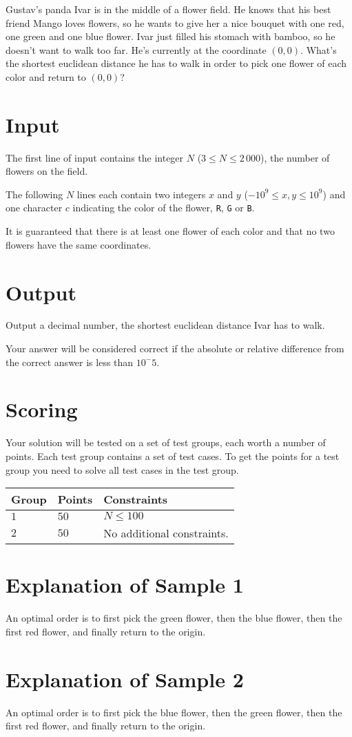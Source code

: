 \noindent

Gustav's panda Ivar is in the middle of a flower field.
He knows that his best friend Mango loves flowers, so he wants to give her a nice bouquet with one red, one green and one blue flower.
Ivar just filled his stomach with bamboo, so he doesn't want to walk too far.
He's currently at the coordinate $(0,0)$. What's the shortest euclidean distance he has to walk in order to pick one flower of each color and return to $(0,0)$?

\section*{Input}
The first line of input contains the integer $N$ ($3 \leq N \leq 2\,000$), the number of flowers on the field.

The following $N$ lines each contain two integers $x$ and $y$ ($-10^9 \leq x,y \leq 10^9$) and one character $c$ indicating the color
of the flower, \texttt{R}, \texttt{G} or \texttt{B}.

It is guaranteed that there is at least one flower of each color and that no two flowers have the same coordinates.

\section*{Output}
Output a decimal number, the shortest euclidean distance Ivar has to walk.

Your answer will be considered correct if the absolute or relative difference from the correct answer is less than $10^-5$.

\section*{Scoring}
Your solution will be tested on a set of test groups, each worth a number of points. Each test group contains
a set of test cases. To get the points for a test group you need to solve all test cases in the test group.

\noindent
\begin{tabular}{| l | l | p{12cm} |}
  \hline
  \textbf{Group} & \textbf{Points} & \textbf{Constraints} \\ \hline
  $1$    & $50$       & $N \leq 100$ \\ \hline
  $2$    & $50$       & No additional constraints. \\ \hline
\end{tabular}

\section*{Explanation of Sample 1}
An optimal order is to first pick the green flower, then the blue flower, then the first red flower, and finally return to the origin.

\section*{Explanation of Sample 2}
An optimal order is to first pick the blue flower, then the green flower, then the first red flower, and finally return to the origin.
